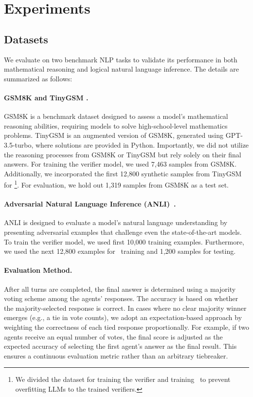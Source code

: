 \section{Experiments}
\label{sec:exp}

\safevspace{-1.5mm}
\subsection{Datasets}
\safevspace{-1mm}

We evaluate \oursspace on  two benchmark NLP tasks to validate its performance in both mathematical reasoning and logical natural language inference. The details are summarized as follows:
\safevspace{-2mm}

\paragraph{GSM8K \citep{cobbe2021training} and TinyGSM \citep{liu2023tinygsm}.} 
GSM8K is a benchmark dataset designed to assess a model's mathematical reasoning abilities, requiring models to solve high-school-level mathematics problems. TinyGSM is an augmented version of GSM8K, generated using GPT-3.5-turbo, where solutions are provided in Python. Importantly, we did not utilize the reasoning processes from GSM8K or TinyGSM but rely solely on their final answers. For training the verifier model, we used 7,463 samples from GSM8K. Additionally, we incorporated the first 12,800 synthetic samples from TinyGSM for \ours\footnote{We divided the dataset for training the verifier and training \ours~to prevent overfitting LLMs to the trained verifiers.}. For evaluation, we hold out 1,319 samples from GSM8K as a test set. 

\paragraph{Adversarial Natural Language Inference (ANLI)~\citep{nie2019adversarial}.}
ANLI is designed to evaluate a model’s natural language understanding by presenting adversarial examples that challenge even the state-of-the-art models. To train the verifier model, we used first 10,000 training examples. Furthermore, we used the next 12,800 examples for \ours~training and 1,200 samples for testing.

\paragraph{Evaluation Method.} 
After all turns are completed, the final answer is determined using a majority voting scheme among the agents' responses. The accuracy is based on whether the majority-selected response is correct.
In cases where no clear majority winner emerges (e.g., a tie in vote counts), we adopt an expectation-based approach by weighting the correctness of each tied response proportionally. For example, if two agents receive an equal number of votes, the final score is adjusted as the expected accuracy of selecting the first agent’s answer as the final result. This ensures a continuous evaluation metric rather than an arbitrary tiebreaker.


